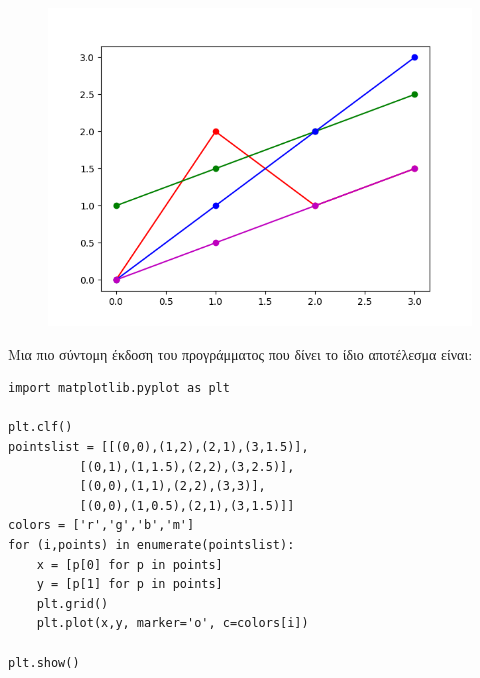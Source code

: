 \begin{figure}
\includegraphics{4plots.png}
\end{figure}

Μια πιο σύντομη έκδοση του προγράμματος που δίνει το ίδιο αποτέλεσμα είναι:
\begin{lstlisting}
import matplotlib.pyplot as plt

plt.clf()
pointslist = [[(0,0),(1,2),(2,1),(3,1.5)],
          [(0,1),(1,1.5),(2,2),(3,2.5)],
          [(0,0),(1,1),(2,2),(3,3)],
          [(0,0),(1,0.5),(2,1),(3,1.5)]]
colors = ['r','g','b','m']
for (i,points) in enumerate(pointslist):
    x = [p[0] for p in points]
    y = [p[1] for p in points]
    plt.grid()
    plt.plot(x,y, marker='o', c=colors[i])

plt.show()
\end{lstlisting}